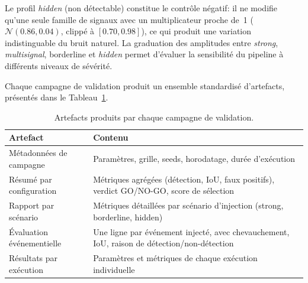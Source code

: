 Le profil \textit{hidden} (non détectable) constitue le contrôle négatif: il ne modifie
qu'une seule famille de signaux avec un multiplicateur proche de~1
($\mathcal{N}(0.86, 0.04)$, clippé à $[0.70, 0.98]$), ce qui produit une variation
indistinguable du bruit naturel. La graduation des amplitudes entre \textit{strong},
\textit{multisignal}, borderline et \textit{hidden} permet d'évaluer la
sensibilité du pipeline à différents niveaux de sévérité.


Chaque campagne de validation produit un ensemble standardisé d'artefacts, présentés dans
le Tableau~\ref{tab:artefacts}.

\begin{table}[H]
    \centering
    \caption{Artefacts produits par chaque campagne de validation.}
    \label{tab:artefacts}
    \begin{tabular}{lp{8cm}}
        \toprule
        \textbf{Artefact}                & \textbf{Contenu} \\
        \midrule
        Métadonnées de campagne          & Paramètres, grille, seeds, horodatage,
                                           durée d'exécution \\
        Résumé par configuration         & Métriques agrégées (détection, IoU, faux positifs),
                                           verdict GO/NO-GO, score de sélection \\
        Rapport par scénario             & Métriques détaillées par scénario d'injection
                                           (strong, borderline, hidden) \\
        Évaluation événementielle        & Une ligne par événement injecté, avec chevauchement,
                                           IoU, raison de détection/non-détection \\
        Résultats par exécution                & Paramètres et métriques de chaque exécution individuelle \\
        \bottomrule
    \end{tabular}
\end{table}


